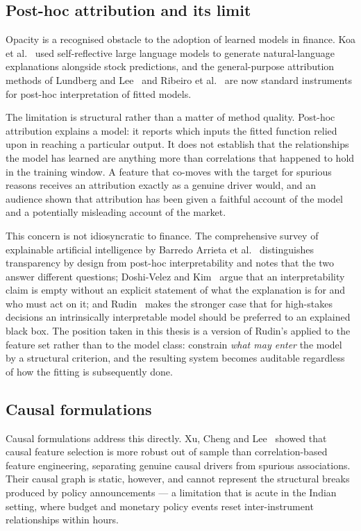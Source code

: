 \subsection{Post-hoc attribution and its limit}

Opacity is a recognised obstacle to the adoption of learned models in finance. Koa et
al.~\cite{koa2024} used self-reflective large language models to generate natural-language
explanations alongside stock predictions, and the general-purpose attribution methods of
Lundberg and Lee~\cite{lundberg2017} and Ribeiro et al.~\cite{ribeiro2016} are now standard
instruments for post-hoc interpretation of fitted models.

The limitation is structural rather than a matter of method quality. Post-hoc attribution
explains a model: it reports which inputs the fitted function relied upon in reaching a
particular output. It does not establish that the relationships the model has learned are
anything more than correlations that happened to hold in the training window. A feature that
co-moves with the target for spurious reasons receives an attribution exactly as a genuine
driver would, and an audience shown that attribution has been given a faithful account of the
model and a potentially misleading account of the market.

This concern is not idiosyncratic to finance. The comprehensive survey of explainable artificial
intelligence by Barredo Arrieta et al.~\cite{arrieta2020} distinguishes transparency by design
from post-hoc interpretability and notes that the two answer different questions; Doshi-Velez and
Kim~\cite{doshivelez2017} argue that an interpretability claim is empty without an explicit
statement of what the explanation is for and who must act on it; and Rudin~\cite{rudin2019} makes
the stronger case that for high-stakes decisions an intrinsically interpretable model should be
preferred to an explained black box. The position taken in this thesis is a version of Rudin's
applied to the feature set rather than to the model class: constrain \emph{what may enter} the
model by a structural criterion, and the resulting system becomes auditable regardless of how the
fitting is subsequently done.

\subsection{Causal formulations}

Causal formulations address this directly. Xu, Cheng and Lee~\cite{xu2026causal} showed that
causal feature selection is more robust out of sample than correlation-based feature
engineering, separating genuine causal drivers from spurious associations. Their causal graph
is static, however, and cannot represent the structural breaks produced by policy
announcements --- a limitation that is acute in the Indian setting, where budget and monetary
policy events reset inter-instrument relationships within hours.

